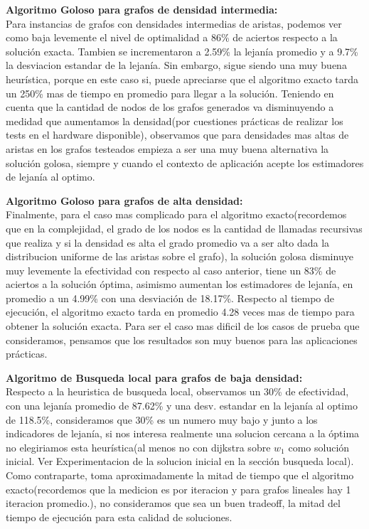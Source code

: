 \vspace{0.5cm}

\textbf{Algoritmo Goloso para grafos de densidad intermedia:}\\
Para instancias de grafos con densidades intermedias de aristas, podemos ver como baja levemente el nivel de optimalidad a 86\% de aciertos respecto a la soluci\'on exacta. Tambien se incrementaron a  2.59\% la lejan\'ia promedio y a 9.7\% la desviacion estandar de la lejan\'ia. Sin embargo, sigue siendo una muy buena heur\'istica, porque en este caso si, puede apreciarse que el algoritmo exacto tarda un 250\% mas de tiempo en promedio para llegar a la soluci\'on. Teniendo en cuenta que la cantidad de nodos de los grafos generados va disminuyendo a medidad que aumentamos la densidad(por cuestiones pr\'acticas de realizar los tests en el hardware disponible), observamos que para densidades mas altas de aristas en los grafos testeados empieza a ser una muy buena alternativa la soluci\'on golosa, siempre y cuando el contexto de aplicaci\'on acepte los estimadores de lejan\'ia al optimo.

\vspace{0.5cm}

\textbf{Algoritmo Goloso para grafos de alta densidad:}\\
Finalmente, para el caso mas complicado para el algoritmo exacto(recordemos que en la complejidad, el grado de los nodos es la cantidad de llamadas recursivas que realiza y si la densidad es alta el grado promedio va a ser alto dada la distribucion uniforme de las aristas sobre el grafo), la soluci\'on golosa disminuye muy levemente la efectividad con respecto al caso anterior, tiene un 83\% de aciertos a la soluci\'on \'optima, asimismo aumentan los estimadores de lejan\'ia, en promedio a un 4.99\% con una desviaci\'on de 18.17\%. Respecto al tiempo de ejecuci\'on, el algoritmo exacto tarda en promedio 4.28 veces mas de tiempo para obtener la soluci\'on exacta. Para ser el caso mas dificil de los casos de prueba que consideramos, pensamos que los resultados son muy buenos para las aplicaciones pr\'acticas.

\vspace{0.5cm}

\textbf{Algoritmo de Busqueda local para grafos de baja densidad:}\\
Respecto a la heuristica de busqueda local, observamos un 30\% de efectividad, con una lejan\'ia promedio de 87.62\% y una desv. estandar en la lejan\'ia al optimo de 118.5\%, consideramos que 30\% es un numero muy bajo y junto a los indicadores de lejan\'ia, si nos interesa realmente una solucion cercana a la \'optima no elegiriamos esta heur\'istica(al menos no con dijkstra sobre $w_1$ como soluci\'on inicial. Ver Experimentacion de la solucion inicial en la secci\'on busqueda local). Como contraparte, toma aproximadamente la mitad de tiempo que el algoritmo exacto(recordemos que la medicion es por iteracion y para grafos lineales hay 1 iteracion promedio.), no consideramos que sea un buen tradeoff, la mitad del tiempo de ejecuci\'on para esta calidad de soluciones.\\

